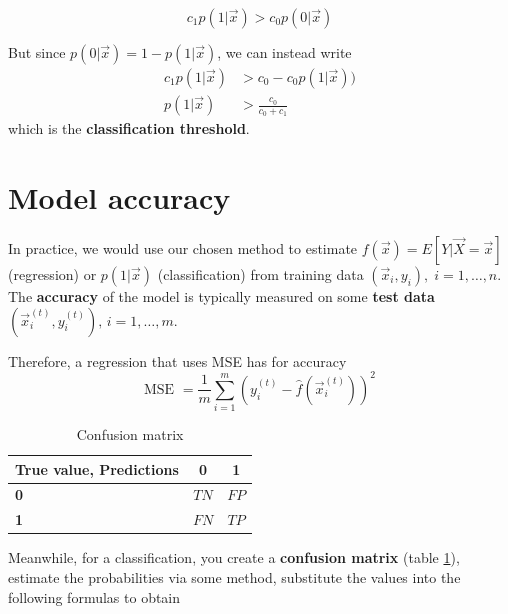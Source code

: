     $$c_1 p(1|\vec{x}) > c_0 p(0|\vec{x})$$

    But since $p(0|\vec{x}) = 1 - p(1|\vec{x})$, we can instead write
    \begin{align*}
    c_1 p(1|\vec{x}) &> c_0 - c_0 p(1|\vec{x})) \\
    p(1|\vec{x}) &> \frac{c_0}{c_0 + c_1}
    \end{align*}
    which is the \textbf{classification threshold}. 


  \section{Model accuracy}
    In practice, we would use our chosen method to estimate
    $f(\vec{x})=E[Y|\vec{X}=\vec{x}]$ (regression) or $p(1|\vec{x})$
    (classification) from training data $(\vec{x}_i, y_i), \; i = 1, \dots, n$.
    The \textbf{accuracy} of the model is typically measured on some
    \textbf{test data} $(\vec{x}_i^{(t)}, y_i^{(t)}), \, i = 1, \dots, m $.

    Therefore, a regression that uses MSE has for accuracy
    $$\text{MSE } = \frac{1}{m} \sum_{i = 1}^{m}\left(y_i^{(t)} -
                    \hat{f}\left(\vec{x}_i^{(t)}\right)\right)^2$$
    
    
\begin{table}[h]
\centering
\begin{tabular}{|l||c|c|}
	\hline
	\textbf{True value, Predictions} & \textbf{0} & \textbf{1} \\
	\hline
	\hline
	\textbf{0} &  $ TN $ & $ FP $ \\
	\hline
	\textbf{\textbf{1}} & $ FN $ & $ TP $ \\
	\hline
\end{tabular}
\caption{Confusion matrix}
\label{ConfMat}
\end{table} 

    Meanwhile, for a classification, you create a \textbf{confusion matrix}
    (table \ref{ConfMat}), estimate the probabilities via some method,
    substitute the values into the following formulas to obtain
    
